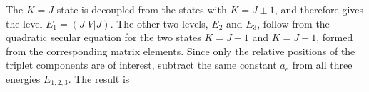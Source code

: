 The $K=J$ state is decoupled from the states with $K=J\pm1$, and therefore gives the level $E_1=(J|V|J)$. The other two levels, $E_2$ and $E_3$, follow from the quadratic secular equation for the two states $K=J-1$ and $K=J+1$, formed from the corresponding matrix elements. Since only the relative positions of the triplet components are of interest, subtract the same constant $a_e$ from all three energies $E_{1,2,3}$. The result is
